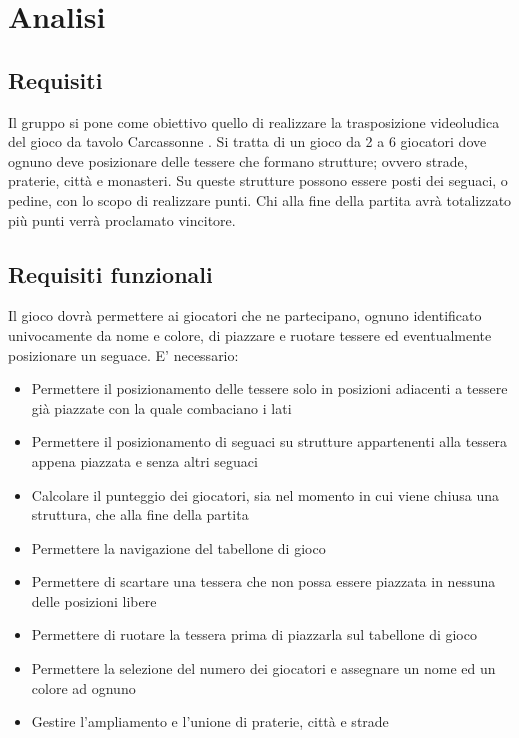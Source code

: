 \section{Analisi}
\subsection{Requisiti}
Il gruppo si pone come obiettivo quello di realizzare la trasposizione videoludica del gioco da tavolo Carcassonne \cite{Carcassonne}. Si tratta di un gioco da 2 a 6 giocatori dove ognuno deve posizionare delle tessere che formano strutture; ovvero strade, praterie, città e monasteri. Su queste strutture possono essere posti dei seguaci, o pedine, con lo scopo di realizzare punti. Chi alla fine della partita avrà totalizzato più punti verrà proclamato vincitore.

\subsection*{Requisiti funzionali}
Il gioco dovrà permettere ai giocatori che ne partecipano, ognuno identificato univocamente da nome e colore, di piazzare e ruotare tessere ed eventualmente posizionare un seguace. E' necessario:

\begin{itemize}
\item Permettere il posizionamento delle tessere solo in posizioni adiacenti a tessere già piazzate con la quale combaciano i lati
\item Permettere il posizionamento di seguaci su strutture appartenenti alla tessera appena piazzata e senza altri seguaci
\item Calcolare il punteggio dei giocatori, sia nel momento in cui viene chiusa una struttura, che alla fine della partita
\item Permettere la navigazione del tabellone di gioco
\item Permettere di scartare una tessera che non possa essere piazzata in nessuna delle posizioni libere
\item Permettere di ruotare la tessera prima di piazzarla sul tabellone di gioco
\item Permettere la selezione del numero dei giocatori e assegnare un nome ed un colore ad ognuno
\item Gestire l'ampliamento e l'unione di praterie, città e strade
\end{itemize}

